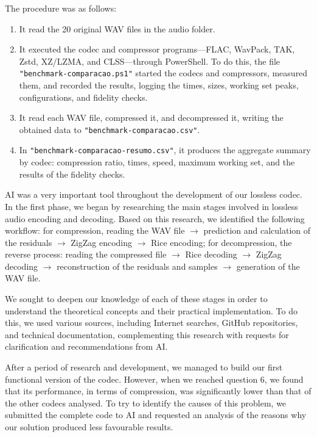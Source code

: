 The procedure was as follows:

\begin{enumerate}
    \item It read the 20 original WAV files in the audio folder.

    \item It executed the codec and compressor programs---FLAC, WavPack, TAK, Zstd, XZ/LZMA, and CLSS---through PowerShell. To do this, the file \texttt{"benchmark-comparacao.ps1"} started the codecs and compressors, measured them, and recorded the results, logging the times, sizes, working set peaks, configurations, and fidelity checks.

    \item It read each WAV file, compressed it, and decompressed it, writing the obtained data to \texttt{"benchmark-comparacao.csv"}.

    \item In \texttt{"benchmark-comparacao-resumo.csv"}, it produces the aggregate summary by codec: compression ratio, times, speed, maximum working set, and the results of the fidelity checks.
\end{enumerate}

AI was a very important tool throughout the development of our lossless codec. In the first phase, we began by researching the main stages involved in lossless audio encoding and decoding. Based on this research, we identified the following workflow: for compression, reading the WAV file $\rightarrow$ prediction and calculation of the residuals $\rightarrow$ ZigZag encoding $\rightarrow$ Rice encoding; for decompression, the reverse process: reading the compressed file $\rightarrow$ Rice decoding $\rightarrow$ ZigZag decoding $\rightarrow$ reconstruction of the residuals and samples $\rightarrow$ generation of the WAV file.

We sought to deepen our knowledge of each of these stages in order to understand the theoretical concepts and their practical implementation. To do this, we used various sources, including Internet searches, GitHub repositories, and technical documentation, complementing this research with requests for clarification and recommendations from AI.

After a period of research and development, we managed to build our first functional version of the codec. However, when we reached question 6, we found that its performance, in terms of compression, was significantly lower than that of the other codecs analysed. To try to identify the causes of this problem, we submitted the complete code to AI and requested an analysis of the reasons why our solution produced less favourable results.

